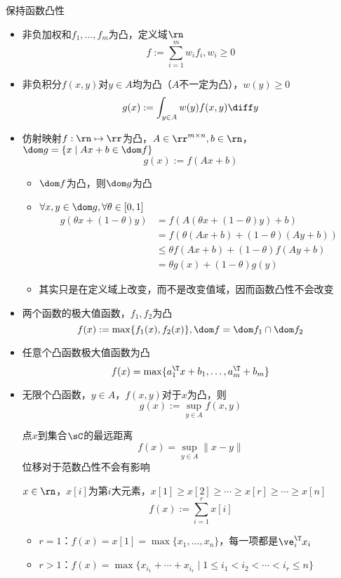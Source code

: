 保持函数凸性
\begin{itemize}
	\item 非负加权和$f_1,\ldots,f_m$为凸，定义域$\rn$
	\[f:=\sum_{i=1}^m w_if_i,w_i\geq 0\]
	\item 非负积分$f(x,y)$对$y\in A$均为凸（$A$不一定为凸），$w(y)\geq 0$
	\[g(x):=\int_{y\in A}w(y)f(x,y)\diff y\]
	\item 仿射映射$f:\rn\mapsto\rr$为凸，$A\in\rr^{m\times n},b\in\rn$，$\dom g=\{x\mid Ax+b\in\dom f\}$
	\[g(x):=f(Ax+b)\]
	\begin{analysis}
	\begin{itemize}
		\item $\dom f$为凸，则$\dom g$为凸
		\item $\forall x,y\in\dom g,\forall\theta\in[0,1]$
		\[\begin{aligned}
		g(\theta x+(1-\theta)y)&=f(A(\theta x+(1-\theta)y)+b)\\
		&=f(\theta(Ax+b)+(1-\theta)(Ay+b))\\
		&\leq\theta f(Ax+b)+(1-\theta)f(Ay+b)\\
		&=\theta g(x)+(1-\theta)g(y)
		\end{aligned}\]
		\item 其实只是在定义域上改变，而不是改变值域，因而函数凸性不会改变
	\end{itemize}
	\end{analysis}
	\item 两个函数的极大值函数，$f_1,f_2$为凸
	\[f(x):=\max\{f_1(x),f_2(x)\},\dom f=\dom f_1\cap\dom f_2\]
	\item 任意个凸函数极大值函数为凸
	\[f(x)=\max\{a_1^\T x+b_1,\ldots,a_m^\T+b_m\}\]
	\item 无限个凸函数，$y\in A$，$f(x,y)$对于$x$为凸，则
	\[g(x):=\sup_{y\in A} f(x,y)\]
	\begin{example}
	点$x$到集合$\sC$的最远距离
	\[f(x)=\sup_{y\in A}\|x-y\|\]
	位移对于范数凸性不会有影响
	\end{example}
	\begin{example}
	$x\in\rn$，$x[i]$为第$i$大元素，$x[1]\geq x[2]\geq\cdots\geq x[r]\geq\cdots\geq x[n]$
	\[f(x):=\sum_{i=1}^r x[i]\]
	\begin{itemize}
	\item $r=1$：$f(x)=x[1]=\max\{x_1,\ldots,x_n\}$，每一项都是$\ve_i^\T x_i$
	\item $r>1$：$f(x)=\max\{x_{i_1}+\cdots+x_{i_r}\mid 1\leq i_1<i_2<\cdots<i_r\leq n\}$
	\end{itemize}
	\end{example}

\end{itemize}
